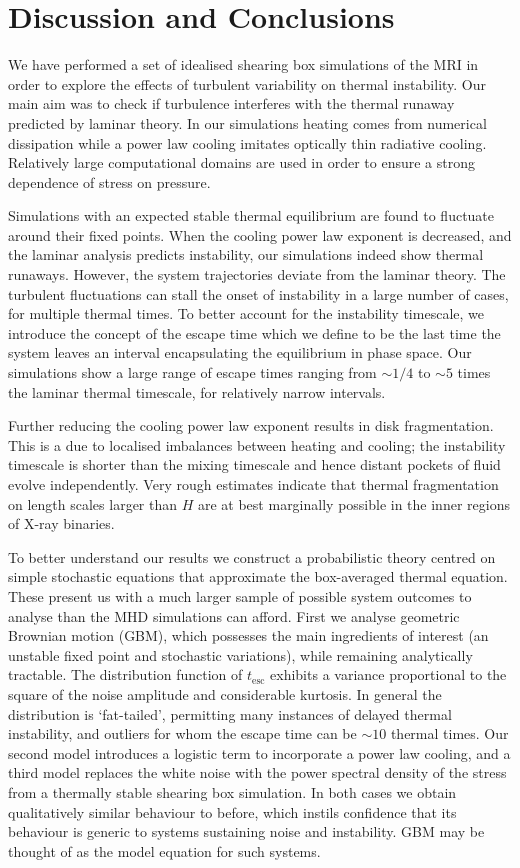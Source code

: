 \documentclass[useAMS]{mn2e}
\begin{document}
\section{Discussion and Conclusions} \label{Sec::TIDC}

We have performed a set of idealised shearing box simulations of the MRI
in order to explore the effects of
turbulent variability on thermal instability. Our main aim was to
check if turbulence interferes with the thermal runaway
predicted by laminar theory. In our
simulations heating comes from numerical dissipation while
a power law cooling imitates optically thin radiative
cooling. Relatively large computational domains are used in  
order to ensure a strong dependence of stress on pressure.  

Simulations with
an expected stable thermal equilibrium are found to fluctuate around
their fixed points. When the cooling power law exponent is decreased,
and the laminar analysis predicts instability, our simulations
indeed show thermal runaways. However, the
system trajectories deviate from the laminar
theory. The turbulent fluctuations can stall the onset of instability
in a large number of cases, for multiple thermal times. To better
account for the instability timescale, we introduce the concept of the
escape time which we define to be the last time the system leaves
an interval encapsulating the equilibrium in phase space.
Our simulations show a large range of escape
times ranging from $\sim 1/4$ to $\sim 5$ times the laminar thermal
timescale, for relatively narrow intervals.

Further reducing the cooling power law exponent results in disk
fragmentation. This is a due to localised imbalances between
heating and cooling; the instability timescale is shorter than the
mixing timescale and hence distant pockets of fluid evolve
independently. 
Very rough estimates indicate that thermal fragmentation on length scales larger
than $H$ are at best marginally possible in the inner regions 
of X-ray binaries.     


To better understand our results we construct a probabilistic theory centred
on 
simple stochastic equations that approximate the box-averaged thermal
equation. These present us with a much larger sample of possible
system outcomes to analyse than the MHD simulations can afford.
First we analyse geometric Brownian motion (GBM),
which possesses the main ingredients of interest (an
unstable fixed point and stochastic variations), while remaining
analytically tractable. The distribution function of $t_{\text{esc}}$ exhibits
a variance proportional to the square of the noise amplitude and 
considerable kurtosis. In general the distribution is `fat-tailed',
permitting many instances of delayed thermal instability, and outliers
for whom the escape time can be $\sim 10$ thermal times.   
Our second model introduces a logistic
term to incorporate a power law cooling, and a third model
replaces the white noise with the power spectral density of
the stress from a thermally stable shearing box simulation. In both
cases we obtain qualitatively similar behaviour to before, 
which instils confidence that its behaviour is generic to
systems sustaining noise and instability. GBM
may be thought of as the
model equation for such systems.
\end{document}
